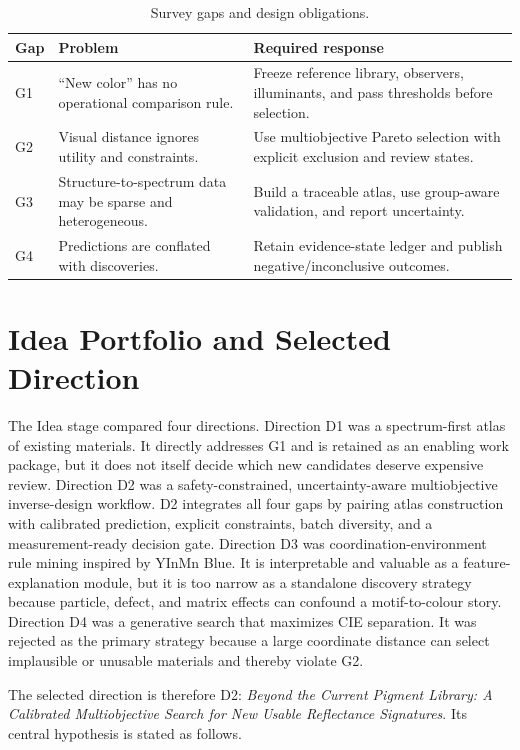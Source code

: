 \documentclass[conference]{IEEEtran}
\begin{document}
\begin{table}[!t]
\caption{Survey gaps and design obligations.}
\label{tab:gaps}
\centering
\renewcommand{\arraystretch}{1.2}
\begin{tabular}{|P{0.10\columnwidth}|P{0.30\columnwidth}|P{0.32\columnwidth}|}
\hline
\textbf{Gap} & \textbf{Problem} & \textbf{Required response} \\
\hline
G1 & ``New color'' has no operational comparison rule. & Freeze reference library, observers, illuminants, and pass thresholds before selection. \\
\hline
G2 & Visual distance ignores utility and constraints. & Use multiobjective Pareto selection with explicit exclusion and review states. \\
\hline
G3 & Structure-to-spectrum data may be sparse and heterogeneous. & Build a traceable atlas, use group-aware validation, and report uncertainty. \\
\hline
G4 & Predictions are conflated with discoveries. & Retain evidence-state ledger and publish negative/inconclusive outcomes. \\
\hline
\end{tabular}
\end{table}

\section{Idea Portfolio and Selected Direction}

The Idea stage compared four directions. Direction D1 was a spectrum-first atlas of existing materials. It directly addresses G1 and is retained as an enabling work package, but it does not itself decide which new candidates deserve expensive review. Direction D2 was a safety-constrained, uncertainty-aware multiobjective inverse-design workflow. D2 integrates all four gaps by pairing atlas construction with calibrated prediction, explicit constraints, batch diversity, and a measurement-ready decision gate. Direction D3 was coordination-environment rule mining inspired by YInMn Blue. It is interpretable and valuable as a feature-explanation module, but it is too narrow as a standalone discovery strategy because particle, defect, and matrix effects can confound a motif-to-colour story. Direction D4 was a generative search that maximizes CIE separation. It was rejected as the primary strategy because a large coordinate distance can select implausible or unusable materials and thereby violate G2.

The selected direction is therefore D2: \emph{Beyond the Current Pigment Library: A Calibrated Multiobjective Search for New Usable Reflectance Signatures}. Its central hypothesis is stated as follows.
\end{document}
